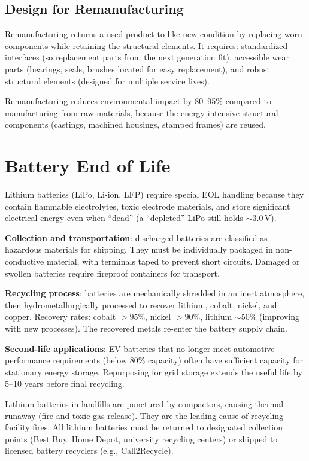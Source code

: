 \subsection{Design for Remanufacturing}
Remanufacturing returns a used product to like-new condition by replacing worn components while retaining the structural elements. It requires: standardized interfaces (so replacement parts from the next generation fit), accessible wear parts (bearings, seals, brushes located for easy replacement), and robust structural elements (designed for multiple service lives).

Remanufacturing reduces environmental impact by 80--95\% compared to manufacturing from raw materials, because the energy-intensive structural components (castings, machined housings, stamped frames) are reused.

\section{Battery End of Life}
Lithium batteries (LiPo, Li-ion, LFP) require special EOL handling because they contain flammable electrolytes, toxic electrode materials, and store significant electrical energy even when ``dead'' (a ``depleted'' LiPo still holds $\sim$3.0\,V).

\textbf{Collection and transportation}: discharged batteries are classified as hazardous materials for shipping. They must be individually packaged in non-conductive material, with terminals taped to prevent short circuits. Damaged or swollen batteries require fireproof containers for transport.

\textbf{Recycling process}: batteries are mechanically shredded in an inert atmosphere, then hydrometallurgically processed to recover lithium, cobalt, nickel, and copper. Recovery rates: cobalt $> 95\%$, nickel $> 90\%$, lithium $\sim$50\% (improving with new processes). The recovered metals re-enter the battery supply chain.

\textbf{Second-life applications}: EV batteries that no longer meet automotive performance requirements (below 80\% capacity) often have sufficient capacity for stationary energy storage. Repurposing for grid storage extends the useful life by 5--10 years before final recycling.

\begin{warningbox}
Lithium batteries in landfills are punctured by compactors, causing thermal runaway (fire and toxic gas release). They are the leading cause of recycling facility fires. All lithium batteries must be returned to designated collection points (Best Buy, Home Depot, university recycling centers) or shipped to licensed battery recyclers (e.g., Call2Recycle).
\end{warningbox}

